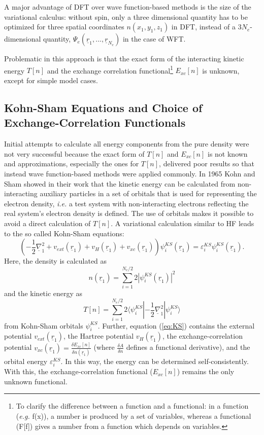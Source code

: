 \documentclass[11pt,DIV=13,BCOR=5mm,a4paper,headinclude]{scrbook}
\renewcommand{\vec}[1]{\underline{#1}}
\begin{document}
A major advantage of DFT over wave function-based methods is the size of the variational calculus: without spin, only a three dimensional quantity has to be optimized for three spatial coordinates $n(x_1,y_1,z_1)$ in DFT, instead of a $3N_e$-dimensional quantity, $\Psi_e(\vec{r}_1,...,\vec{r}_{N_e})$ in the case of WFT. %

Problematic in this approach is that the exact form of the interacting kinetic energy $T[n]$ and the exchange correlation functional\footnote{To clarify the difference between a function and a functional: in a function (\textit{e.g.} f(x)), a number is produced by a set of variables, whereas a functional (F[f]) gives a number from a function which depends on variables.} $E_{xc}[n]$ is unknown, except for simple model cases.

\subsection{Kohn-Sham Equations and Choice of Exchange-Correlation Functionals}
Initial attempts to calculate all energy components from the pure density were not very successful because the exact form of $T[n]$ and $E_{xc}[n]$ is not known and approximations, especially the ones for $T[n]$, delivered poor results so that instead wave function-based methods were applied commonly.
In 1965 Kohn and Sham showed in their work\cite{Kohn-Sham1965} that the kinetic energy can be calculated from non-interacting auxiliary particles in a set of orbitals that is used for representing the electron density, \textit{i.e.} a test system with non-interacting electrons reflecting the real system's electron density is defined.
The use of orbitals makes it possible to avoid a direct calculation of $T[n]$\cite{Gross03}. %
A variational calculation similar to HF leads to the so called Kohn-Sham equations:
\begin{equation}\label{eq:KS}
 \left(-\frac{1}{2}\vec{\nabla}^2_1 + v_{ext}(\vec{r}_1) + v_{H}(\vec{r}_1) + v_{xc}(\vec{r}_1) \right)\psi^{KS}_i(\vec{r}_1) = \varepsilon_i^{KS}\psi^{KS}_i(\vec{r}_1).
\end{equation}
Here, the density is calculated as
\begin{equation}
n(\vec{r}_1)=\sum_{i=1}^{N_e/2}2|\psi_i^{KS}(\vec{r}_1)|^2
\end{equation}
 and the kinetic energy as
 \begin{equation}
 T[n]=\sum_{i=1}^{N_e/2}2\langle\psi_i^{KS}|-\frac{1}{2}\vec{\nabla}_1^2|\psi_i^{KS}\rangle
 \end{equation}
 from Kohn-Sham orbitals $\psi_i^{KS}$.
Further, equation (\ref{eq:KS}) contains the external potential $v_{ext}(\vec{r}_1)$, the Hartree potential $v_{H}(\vec{r}_1)$, the exchange-correlation potential $v_{xc}(\vec{r}_1)=\frac{\delta E_{xc}[n]}{\delta n(\vec{r}_1)}$ (where $\frac{\delta A}{\delta n}$ defines a functional derivative), and the orbital energy $\varepsilon_i^{KS}$.
In this way, the energy can be determined self-consistently.
With this, the exchange-correlation functional ($E_{xc}[n]$) remains the only unknown functional.
\end{document}
